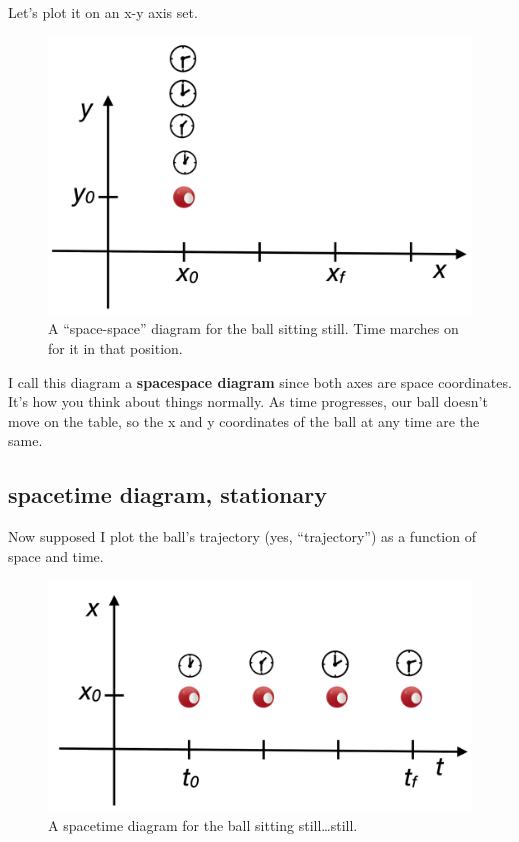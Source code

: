 \documentclass[
  letterpaper,
  DIV=11,
  numbers=noendperiod,
  oneside]{scrreprt}
\begin{document}
Let's plot it on an x-y axis set.

\begin{figure}[H]

{\centering \includegraphics[width=0.8\linewidth,height=\textheight,keepaspectratio]{mechanics/motion/screenshot_3656.png}

}

\caption{A ``space-space'' diagram for the ball sitting still. Time
marches on for it in that position.}

\end{figure}%

I call this diagram a \textbf{spacespace diagram} since both axes are
space coordinates. It's how you think about things normally. As time
progresses, our ball doesn't move on the table, so the x and y
coordinates of the ball at any time are the same.

\subsection{spacetime diagram,
stationary}\label{spacetime-diagram-stationary}

Now supposed I plot the ball's trajectory (yes, ``trajectory'') as a
function of space and time.

\begin{figure}[H]

{\centering \includegraphics[width=0.8\linewidth,height=\textheight,keepaspectratio]{mechanics/motion/screenshot_3658.png}

}

\caption{A spacetime diagram for the ball sitting still\ldots still.}

\end{figure}%
\end{document}
